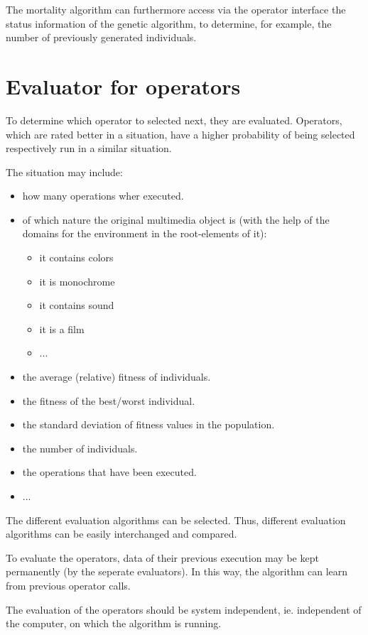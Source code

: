 The mortality algorithm can furthermore access via the operator interface the status information of the genetic algorithm, to determine, for example, the number of previously generated individuals.


\section{Evaluator for operators}

To determine which operator to selected next, they are evaluated. Operators, which are rated better in a situation, have a higher probability of being selected respectively run in a similar situation.

\bigskip\noindent
The situation may include:
\begin{itemize}
 \item how many operations wher executed.
 \item of which nature the original multimedia object is (with the help of the domains for the environment in the root-elements of it):
 \begin{itemize}
  \item it contains colors
  \item it is monochrome
  \item it contains sound
  \item it is a film
  \item ...
 \end{itemize}
 \item the average (relative) fitness of individuals.
 \item the fitness of the best/worst individual.
 \item the standard deviation of fitness values in the population.
 \item the number of individuals.
 \item the operations that have been executed.
 \item ...
\end{itemize}

The different evaluation algorithms can be selected. Thus, different evaluation algorithms can be easily interchanged and compared.

To evaluate the operators, data of their previous execution may be kept permanently (by the seperate evaluators). In this way, the algorithm can learn from previous operator calls.

The evaluation of the operators should be system independent, ie. independent of the computer, on which the algorithm is running.

